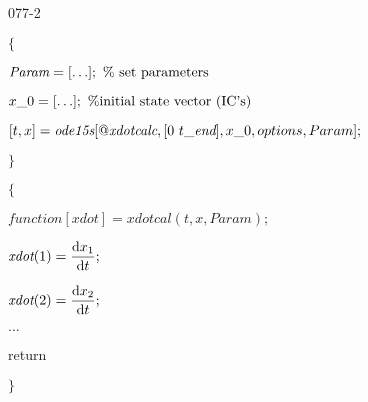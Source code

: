 \begin{mitframe}{077-2}
    
\begin{listone}
	\item $\big\{$ 
    \item $\textit{Param}=[\ldots];~\%\textnormal{ set parameters}$
    \item $\disp\_0=[\ldots];~\%\textnormal{initial state vector (IC's)}$
	\item $[\timet,\disp]=\textit{ode15s}[@\textit{xdotcalc},[0~\timet\_\textit{end}],\disp\_0, options, Param];$
    \item $\big\}$
    
	\item $\big\{$
    \item $\textit{function}[\textit{xdot}]=\textit{xdotcal}(t,x, Param);$ 
	\item $\textit{xdot}(1)=\dfrac{\mathrm{d}\disp_1}{\mathrm{d}\timet};$
	\item $\textit{xdot}(2) =\dfrac{\mathrm{d}\disp_2}{\mathrm{d}\timet};$
	\item $\ldots$
    \item return
    \item $\big\}$

\end{listone}    
\end{mitframe}